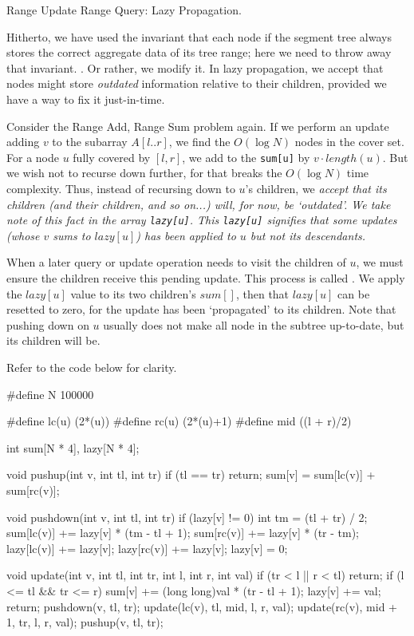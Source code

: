 \secc Range Update Range Query: Lazy Propagation.

Hitherto, we have used the invariant that each node if the segment tree always stores the correct aggregate data of its tree range; here we need to throw away that invariant.  . Or rather, we modify it. In lazy propagation, we accept that nodes might store {\it outdated} information relative to their children, provided we have a way to fix it just-in-time.

Consider the Range Add, Range Sum problem again. If we perform an update adding $v$ to the subarray $A[l..r]$, we find the $O(\log N)$ nodes in the cover set.  For a node $u$ fully covered by $[l, r]$, we add to the {\tt sum[u]} by $v \cdot length (u)$.  But we wish not to recurse down further, for that breaks the $O(\log N)$ time complexity.  Thus, instead of recursing down to $u$'s children, we \it accept \rm that its children (and their children, and so on...) will, for now, be `outdated'.  We take note of this fact in the array {\tt lazy[u]}.  This {\tt lazy[u]} signifies that some updates (whose $v$ sums to $lazy[u]$) has been applied to $u$ but not its descendants.

When a later query or update operation needs to visit the children of $u$, we must ensure the children receive this pending update. This process is called {\it {} }. We apply the $lazy[u]$ value to its two children's $sum[]$, then that $lazy[u]$ can be resetted to zero, for the update has been `propagated' to its children.  Note that pushing down on $u$ usually does not make all node in the subtree up-to-date, but its children will be.

Refer to the code below for clarity.

\begtt
#define N 100000

#define lc(u) (2*(u))
#define rc(u) (2*(u)+1)
#define mid ((l + r)/2)

int sum[N * 4], lazy[N * 4];

void pushup(int v, int tl, int tr) {
    if (tl == tr) return;
    sum[v] = sum[lc(v)] + sum[rc(v)];
  }

void pushdown(int v, int tl, int tr) {
    if (lazy[v] != 0) {
        int tm = (tl + tr) / 2;
        sum[lc(v)] += lazy[v] * (tm - tl + 1);
        sum[rc(v)] += lazy[v] * (tr - tm);
        lazy[lc(v)] += lazy[v];
        lazy[rc(v)] += lazy[v];
        lazy[v] = 0;
      }
  }

void update(int v, int tl, int tr, int l, int r, int val) {
    if (tr < l || r < tl)
    return;
    if (l <= tl && tr <= r) {
        sum[v] += (long long)val * (tr - tl + 1);
        lazy[v] += val;
        return;
      }
    pushdown(v, tl, tr);
    update(lc(v), tl, mid, l, r, val);
    update(rc(v), mid + 1, tr, l, r, val);
    pushup(v, tl, tr);
  }

